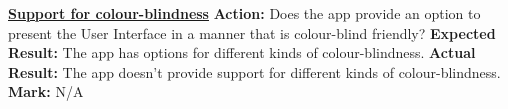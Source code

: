 \documentclass[english]{article}
\begin{document}
        \textbf{\underline{Support for colour-blindness}}\newline
		    \textbf{Action:} Does the app provide an option to present the User Interface in a manner that is colour-blind friendly?\newline
            \textbf{Expected Result:} The app has options for different kinds of colour-blindness.\newline
            \textbf{Actual Result:} The app doesn't provide support for different kinds of colour-blindness.\newline
            \textbf{Mark:} N/A\newline


%		
%		
%		
%		
%		
%
%		
%		
%		
\end{document}
